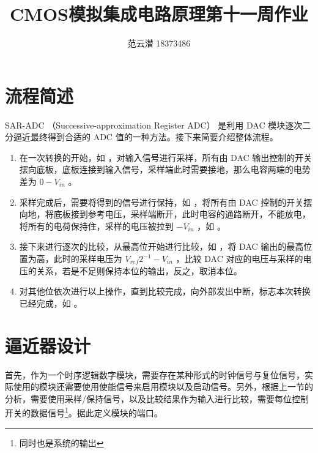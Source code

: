 \documentclass[lang=cn,11pt,a4paper,cite=authoryear]{elegantpaper}
\title{CMOS模拟集成电路原理\quad 第十一周作业}
\author{范云潜 18373486}
\institute{微电子学院 184111 班}
\date{\zhtoday}
\begin{document}
\maketitle


\tableofcontents

\listoffigures

\section{流程简述}

SAR-ADC （Successive-approximation Register ADC） 是利用 DAC 模块逐次二分逼近最终得到合适的 ADC 值的一种方法。接下来简要介绍整体流程。

\begin{enumerate}
    \item 在一次转换的开始，如  ，对输入信号进行采样，所有由 DAC 输出控制的开关摆向底板，底板连接到输入信号，采样端此时需要接地，那么电容两端的电势差为 \(0 - V_{in}\) 。
    \item 采样完成后，需要将得到的信号进行保持，如  ，将所有由 DAC 控制的开关摆向地，将底板接到参考电压，采样端断开，此时电容的通路断开，不能放电，将所有的电荷保持住，采样的电压被拉到 \(- V_{in}\) ，如  。
    \item 接下来进行逐次的比较，从最高位开始进行比较，如  ，将 DAC 输出的最高位置为高，此时的采样电压为 \(V_{ref} 2^{-1} - V_{in }\) ，比较 DAC 对应的电压与采样的电压的关系，若是不足则保持本位的输出，反之，取消本位。
    \item 对其他位依次进行以上操作，直到比较完成，向外部发出中断，标志本次转换已经完成，如  。
\end{enumerate}







\section{逼近器设计}

首先，作为一个时序逻辑数字模块，需要存在某种形式的时钟信号与复位信号，实际使用的模块还需要使用使能信号来启用模块以及启动信号。另外，根据上一节的分析，需要使用采样/保持信号，以及比较结果作为输入进行比较，需要每位控制开关的数据信号\footnote{同时也是系统的输出}。据此定义模块的端口。
\end{document}
